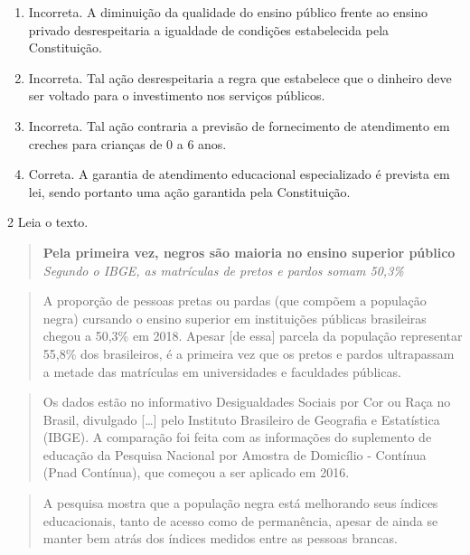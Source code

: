 \begin{enumerate}
\def\labelenumi{\alph{enumi})}
\tightlist
\item
  Incorreta. A diminuição da qualidade do ensino público frente ao
  ensino privado desrespeitaria a igualdade de condições estabelecida
  pela Constituição.
\item
  Incorreta. Tal ação desrespeitaria a regra que estabelece que o
  dinheiro deve ser voltado para o investimento nos serviços públicos.
\item
  Incorreta. Tal ação contraria a previsão de fornecimento de
  atendimento em creches para crianças de 0 a 6 anos.
\item
  Correta. A garantia de atendimento educacional especializado é
  prevista em lei, sendo portanto uma ação garantida pela Constituição.
\end{enumerate}

\num{2} Leia o texto.

\begin{quote}
\textbf{Pela primeira vez, negros são maioria no ensino superior público}
\textit{Segundo o IBGE, as matrículas de pretos e pardos somam 50,3\%}
\end{quote}

\begin{quote}
A proporção de pessoas pretas ou pardas (que compõem a população negra)
cursando o ensino superior em instituições públicas brasileiras chegou a
50,3\% em 2018. Apesar {[}de essa{]} parcela da população representar
55,8\% dos brasileiros, é a primeira vez que os pretos e pardos
ultrapassam a metade das matrículas em universidades e faculdades
públicas.
\end{quote}

\begin{quote}
Os dados estão no informativo Desigualdades Sociais por Cor ou Raça no
Brasil, divulgado {[}\ldots{}{]} pelo Instituto Brasileiro de Geografia
e Estatística (IBGE). A comparação foi feita com as informações do
suplemento de educação da Pesquisa Nacional por Amostra de Domicílio -
Contínua (Pnad Contínua), que começou a ser aplicado em 2016.
\end{quote}

\begin{quote}
A pesquisa mostra que a população negra está melhorando seus índices
educacionais, tanto de acesso como de permanência, apesar de ainda se
manter bem atrás dos índices medidos entre as pessoas brancas.
\end{quote}

